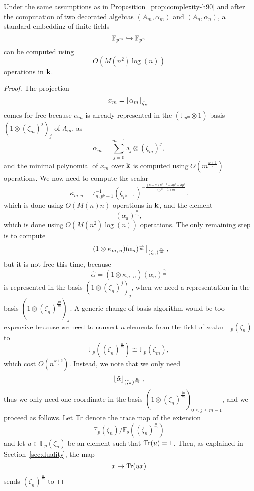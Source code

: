 \begin{prop}
  Under the same assumptions as in Proposition~\ref{prop:complexity-h90} and
  after the computation of two decorated algebras $(A_m,\alpha_m)$ and $(A_n,\alpha_n)$, a standard
  embedding of finite fields
  \[
    \mathbb{F}_{p^m}\hookrightarrow\mathbb{F}_{p^{n}}
  \]
  can be computed using 
  \[
    O(M(n^2)\log(n))
  \]
  operations in $\mathbf{k}$.
\end{prop}
\begin{proof}
 The projection
 \[
   x_m = \left\lfloor \alpha_m \right\rfloor_{\zeta_m}
 \]
 comes for free because $\alpha_m$ is already represented in the
 $(\mathbb{F}_{p^{m}}\otimes1)$-basis $(1\otimes(\zeta_m)^j)_j$ of $A_m$, \ie as
 \[
   \alpha_m = \sum_{j=0}^{m-1}a_j\otimes(\zeta_m)^j,
 \]
 and the minimal polynomial of $x_m$ over $\mathbf{k}$ is computed using
 $O(m^{\frac{\omega+1}{2}})$ operations. We now need to compute the scalar
 \[
    \kappa_{m, n} = \iota_{n,
    p^b-1}^{-1}(\zeta_{p^b-1})^{-\frac{(b-a)p^{b+a}-bp^b+ap^a}{(p^a-1)m}}.
 \]
 which is done using $O(M(n)n)$ operations in $\mathbf{k}$, and the element
 \[
   (\alpha_n)^{\frac{n}{m}},
 \]
 which is done using $O(M(n^2)\log(n))$ operations. The only remaining step is
 to compute
 \[
   \left\lfloor (1\otimes\kappa_{m,\,n})(\alpha_{n})^{\frac{n}{m}} \right\rfloor_{(\zeta_n)^{\frac{n}{m}}},
 \]
 but it is not free this time, because
 \[
   \hat\alpha = (1\otimes\kappa_{m,\,n})(\alpha_{n})^{\frac{n}{m}}
 \]
 is represented in the basis $(1\otimes(\zeta_n)^j)_j$, when we need a representation
 in the basis $(1\otimes(\zeta_n)^{\frac{jn}{m}})_j$. A generic change of basis
 algorithm would be too expensive because we need to convert $n$ elements from
 the field of scalar $\mathbb{F}_{p}(\zeta_n)$ to
 \[
   \mathbb{F}_p( (\zeta_n)^{\frac{n}{m}}) \cong \mathbb{F}_p(\zeta_m),
 \]
 which cost $O(n^{\frac{\omega+3}{2}})$. Instead, we note that we only need
 \[
   \left\lfloor \hat\alpha \right\rfloor_{(\zeta_n)^{\frac{n}{m}}},
 \]
 thus we only need one coordinate in the basis
 $(1\otimes(\zeta_n)^{\frac{jn}{m}})_{0\leq j\leq m-1}$, and we proceed as follows. Let $\operatorname{Tr}$ denote
 the trace map of the extension
 \[
   \mathbb{F}_p(\zeta_n) / \mathbb{F}_p( (\zeta_n)^{\frac{n}{m}})
 \]
 and let $u\in\mathbb{F}_p(\zeta_n)$ be an element such that $\operatorname{Tr}(u)=1$. Then,
 as explained in Section~\ref{sec:duality}, the map
 \[
   x\mapsto\operatorname{Tr}(ux)
 \]
 sends $(\zeta_n)^{\frac{n}{m}}$ to
\end{proof}
%
